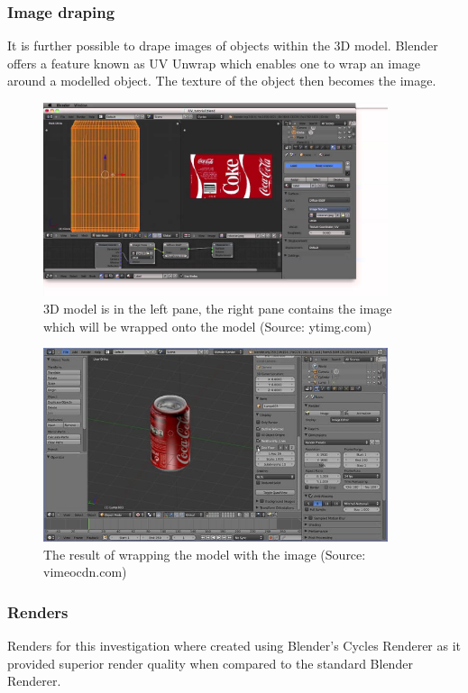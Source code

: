 \documentclass[11pt,a4paper]{report}
\begin{document}
			\subsubsection{Image draping}
				It is further possible to drape images of objects within the 3D model. Blender offers a feature known as UV Unwrap which enables one to wrap an image around a modelled object. The texture of the object then becomes the image.
				\begin{figure}[h!]
					\centering
					\includegraphics[width=0.9\textwidth]{blender_uv_unwrap_1}
					\caption{3D model is in the left pane, the right pane contains the image which will be wrapped onto the model (Source: ytimg.com)}
					\label{fig:light_reflection}
				\end{figure}
				\begin{figure}[h!]
					\centering
					\includegraphics[width=0.9\textwidth]{blender_uv_unwrap_2}
					\caption{The result of wrapping the model with the image (Source: vimeocdn.com)}
					\label{fig:light_reflection}
				\end{figure}
				
			\subsubsection{Renders}
				Renders for this investigation where created using Blender's Cycles Renderer as it provided superior render quality when compared to the standard Blender Renderer.
				
\end{document}

